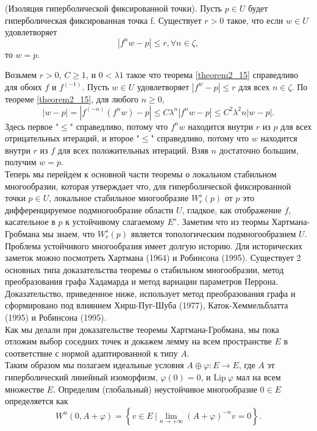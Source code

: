 \begin{theorem}
\label{theorem2_16} (Изоляция гиперболической фиксированной точки). Пусть $p \in U$ будет гиперболическая фиксированная точка f. Существует $r > 0$ такое, что если $w \in U$ удовлетворяет
$$
|f^n w - p| \leq r, \forall n \in \zeta,
$$
то $w = p$.
\end{theorem}
\begin{demo} 
Возьмем $r > 0$, $C \geq 1$, и $0 < \lambda 1$ такое что теорема \ref{theorem2_15} справедливо для обоих $f$  и $f^(-1)$. Пусть $w \in U$ удовлетворяет $|f^ w - p| \leq r$ для всех $n \in \zeta$. По теореме \ref{theorem2_15}, для любого $n \geq 0$,
$$
|w - p| = |f^(-n)(f^n w) - p| \leq C \lambda^n |f^n w - p| \leq C^2 \lambda^2n |w - p|.
$$
Здесь первое "$\leq$" справедливо, потому что $f^n w$ находится внутри $r$ из $p$ для всех отрицательных итераций, и второе "$\leq$" справедливо, потому что $w$ находится внутри $r$ из $f$ для всех положительных итераций. Взяв $n$  достаточно большим, получим $w = p$. \\ 
Теперь мы перейдем к основной части теоремы о локальном стабильном многообразии, которая утверждает что, для гиперболической фиксированной точки $p \in U$, локальное стабильное многообразие $W_r^s(p)$ от $p$ это дифференцируемое подмногообразие области $U$, гладкое, как отображение $f$, касательное в $p$ к устойчивому слагаемому $E^s$. Заметим что из теормы Хартмана-Гробмана мы знаем, что $W_r^s(p)$ является топологическим подмногообразием $U$. \\
Проблема устойчивого многообразия имеет долгую историю. Для исторических заметок можно посмотреть Хартмана (1964) и Робинсона (1995). Существует 2 основных типа доказательства теоремы о стабильном многообразии, метод преобразования графа Хадамарда и метод вариации параметров Перрона. Доказательство, приведенное ниже, использует метод преобразования графа и сформировано под влиянием Хирш-Пуг-Шуба (1977), Каток-Хеммельблатта (1995) и Робинсона (1995). \\
Как мы делали при доказательстве теоремы Хартмана-Гробмана, мы пока отложим выбор соседних точек и докажем лемму на всем пространстве $E$ в соответствие с нормой адаптированной к типу $A$. \\
Таким образом мы полагаем идеальные условия $A \oplus \varphi : E \rightarrow E$, где $A$ эт гиперболический линейный изоморфизм, $\varphi(0)=0$, и $\mathrm{Lip} \  \varphi$ мал на всем множестве $E$. Определим (глобальный) неустойчивое многообразие $0 \in E$ определяется как
$$
W^u(0,A+\varphi) = \left\{ v \in E \ | \lim_{n\rightarrow + \infty}{(A+\varphi)^{-n}v=0} \right\}.
$$
\end{demo}
